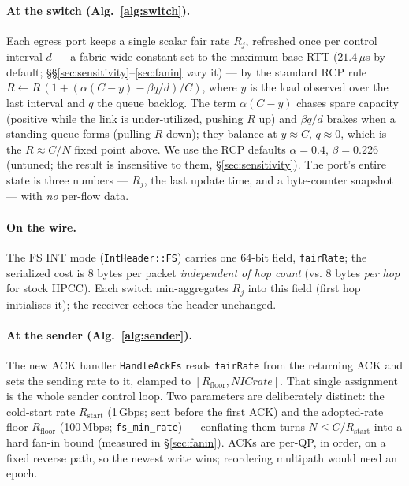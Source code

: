 \documentclass[sigconf, nonacm]{acmart}
\begin{document}
\paragraph{At the switch (Alg.~\ref{alg:switch}).} Each egress port keeps a single scalar fair
rate $R_j$, refreshed once per control interval $d$ --- a fabric-wide constant set to the
maximum base RTT ($21.4\,\mu$s by default; \S\S\ref{sec:sensitivity}--\ref{sec:fanin}
vary it) --- by the standard RCP rule
$R \leftarrow R\,(1 + (\alpha(C - y) - \beta q/d)/C)$, where $y$ is the load observed over the
last interval and $q$ the queue backlog. The term $\alpha(C - y)$ chases spare capacity (positive
while the link is under-utilized, pushing $R$ up) and $\beta q/d$ brakes when a standing queue
forms (pulling $R$ down); they balance at $y \approx C$, $q \approx 0$, which is the
$R \approx C/N$ fixed point above. We use the RCP defaults $\alpha = 0.4$, $\beta = 0.226$
(untuned; the result is insensitive to them, \S\ref{sec:sensitivity}). The port's entire state is
three numbers --- $R_j$, the last update time, and a byte-counter snapshot --- with \emph{no}
per-flow data.

\paragraph{On the wire.} The FS INT mode (\texttt{IntHeader::FS}) carries one 64-bit field,
\texttt{fairRate}; the serialized cost is 8 bytes per packet \emph{independent of hop count}
(vs. 8 bytes \emph{per hop} for stock HPCC). Each switch min-aggregates $R_j$ into this field
(first hop initialises it); the receiver echoes the header unchanged.

\paragraph{At the sender (Alg.~\ref{alg:sender}).} The new ACK handler \texttt{HandleAckFs} reads
\texttt{fairRate} from the returning ACK and sets the sending rate to it, clamped to
$[R_{\mathrm{floor}}, \mathit{NICrate}]$. That single assignment is the whole sender control
loop. Two parameters are deliberately distinct: the cold-start rate $R_{\mathrm{start}}$
(1\,Gbps; sent before the first ACK) and the adopted-rate floor $R_{\mathrm{floor}}$
(100\,Mbps; \texttt{fs\_min\_rate}) --- conflating them turns $N \le C/R_{\mathrm{start}}$
into a hard fan-in bound (measured in \S\ref{sec:fanin}). ACKs are per-QP, in order, on a
fixed reverse path, so the newest write wins; reordering multipath would need an epoch.
\end{document}

